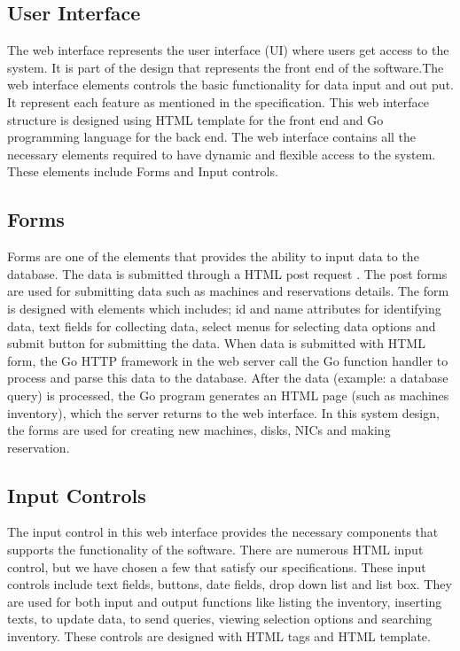 \subsection{User Interface}
The web interface represents the user interface (UI) where users get access to the system. It is part of the design that represents the front end of the software.The web interface elements controls the basic functionality for data input and out put. It represent each feature as mentioned in the specification. This web interface structure is designed using  HTML template for the front end and Go programming language for the back end. 
The web interface contains all the necessary elements required to have dynamic and flexible access to the system. These elements include Forms and Input controls.
\subsection*{Forms}
 Forms are one  of the elements that provides the ability to input data to the database. The data is submitted through a HTML post request \cite{WinNT}. The post forms are used for submitting data such as machines and reservations details. The form is designed with elements which includes; id and name attributes for identifying data, text fields for collecting data, select menus for selecting data options and submit button for submitting the data. When data is submitted with HTML form, the Go HTTP framework in the web server call the Go function handler to process and parse this data to the database.  After the data (example: a database query) is processed, the Go program generates an HTML page (such as machines inventory), which the server returns to the web interface. In this system design, the forms are used for creating new machines, disks, NICs and making reservation. 
\subsection*{Input Controls}
The input control in this web interface provides the necessary components that supports the functionality of the software. There are numerous HTML input control, but we have chosen a few that satisfy our specifications. These input controls include text fields, buttons, date fields, drop down list and list box. They are used for both input and output functions like listing the inventory, inserting texts, to update data, to send queries, viewing selection options and searching inventory. These controls are designed with HTML tags and HTML template.
